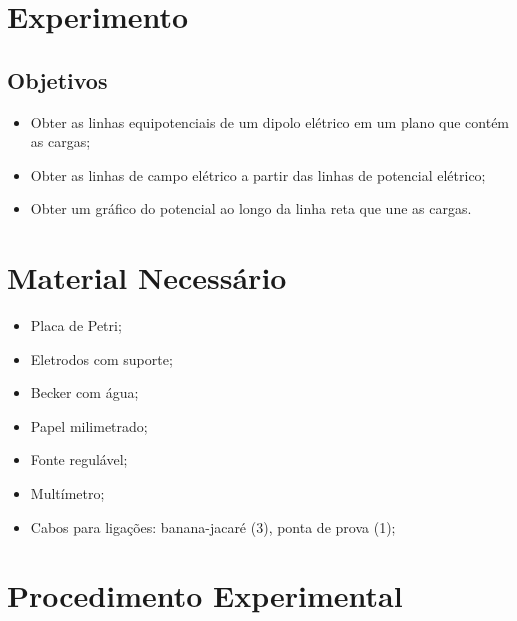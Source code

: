 \section{Experimento}

\subsection{Objetivos}
\label{Sec:ObjetivosSupEquip}

\begin{itemize}
	\item Obter as linhas equipotenciais de um dipolo elétrico em um plano que contém as cargas;
	\item Obter as linhas de campo elétrico a partir das linhas de potencial elétrico;
	\item Obter um gráfico do potencial ao longo da linha reta que une as cargas.
\end{itemize}

\section{Material Necessário}

\begin{itemize}
    \item Placa de Petri;
	\item Eletrodos com suporte;
    \item Becker com água;
	\item Papel milimetrado;
	\item Fonte regulável;
	\item Multímetro;
	\item Cabos para ligações: banana-jacaré (3), ponta de prova (1);
	
\end{itemize}

\section{Procedimento Experimental}

